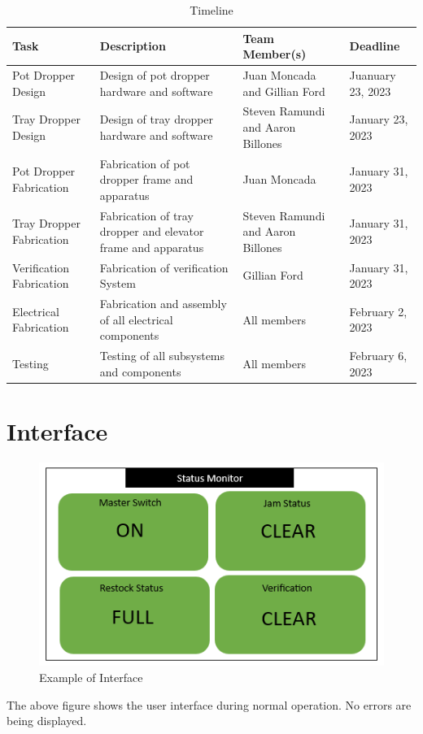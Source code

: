 \documentclass[12pt, titlepage]{article}
\begin{document}
\begin{table}[H]
  \caption{Timeline}
\begin{tabular}{ |p{3cm}|p{5cm}|p{4cm}|p{2cm}| }
  \hline
  Task & Description & Team Member(s) & Deadline\\
  \hline
  Pot Dropper Design & Design of pot dropper hardware and software
  & Juan Moncada and Gillian Ford & Juanuary 23, 2023\\
  \hline
  Tray Dropper Design & Design of tray dropper hardware and software
  & Steven Ramundi and Aaron Billones & January 23, 2023\\
  \hline
  Pot Dropper Fabrication & Fabrication of pot dropper frame and apparatus
  & Juan Moncada & January 31, 2023\\
  \hline
  Tray Dropper Fabrication & Fabrication of tray dropper and elevator frame and apparatus
  & Steven Ramundi and Aaron Billones & January 31, 2023\\
  \hline
  Verification Fabrication & Fabrication of verification System
  & Gillian Ford & January 31, 2023\\
  \hline
  Electrical Fabrication & Fabrication and assembly of all electrical components
  & All members & February 2, 2023\\
  \hline
  Testing & Testing of all subsystems and components
  & All members & February 6, 2023\\
  \hline

\end{tabular}
\end{table}

% 

\newpage{}

\appendix

\section{Interface}

\begin{figure}[H]
  \centering
\includegraphics{interface_new1.png}
\caption{Example of Interface}
  \label{fig:interface1}
\end{figure}
The above figure shows the user interface during normal operation. No errors are being displayed.
\end{document}
